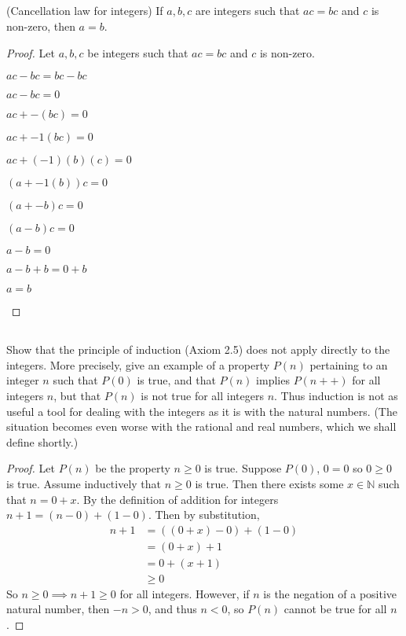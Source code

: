 \documentclass[../../main.tex]{subfiles}
\begin{document}
\subsection{}
\begin{q}
    (Cancellation law for integers) If $a, b, c$ are integers such that $ac = bc$ and $c$ is non-zero, then $a = b$.
\end{q}

\begin{proof}
    Let $a, b, c$ be integers such that $ac = bc$ and $c$ is non-zero.
    \begin{lxl}
        \item $ac - bc = bc - bc$
        \item $ac - bc = 0$
        \item $ac + -(bc) = 0$
        \item $ac + -1(bc) = 0$
        \item $ac + (-1)(b)(c) = 0$
        \item $(a + -1(b))c = 0$
        \item $(a + -b)c = 0$
        \item $(a - b)c=0$
        \item $a-b = 0$ 
        \item $a -b + b = 0 + b$
        \item $a = b$
    \end{lxl}
\end{proof}

\addtocounter{subsection}{1}
\subsection{}
\begin{q}
    Show that the principle of induction (Axiom 2.5) does not apply directly to the integers. More precisely, give an example of a property $P(n)$ pertaining to an integer $n$ such that $P(0)$ is true, and that $P(n)$ implies $P(n++)$ for all integers $n$, but that $P(n)$ is not true for all integers $n$. Thus induction is not as useful a tool for dealing with the integers as it is with the natural numbers. (The situation becomes even worse with the rational and real numbers, which we shall define shortly.)
\end{q}
\begin{proof}
    Let $P(n)$ be the property $n \geq 0$ is true.
    Suppose $P(0)$, $0=0$ so $0 \geq 0$ is true. 
    Assume inductively that $n \geq 0$ is true. 
    Then there exists some $x \in \mathbb{N}$ such that $n = 0 + x$. 
    By the definition of addition for integers $n+1 = (n - 0) + (1 - 0)$. 
    Then by substitution, 
    \begin{align*}
        n+1 &= ((0 + x) - 0) + (1 - 0) \\
        &= (0 + x) + 1 \\
        &= 0 + (x+1) \\
        & \geq 0
    \end{align*}
    So $n \geq 0 \implies n+1 \geq 0$ for all integers.
    However, if $n$ is the negation of a positive natural number, then $-n > 0$, and thus $n < 0$, so $P(n)$ cannot be true for all $n$.
\end{proof}
\end{document}
